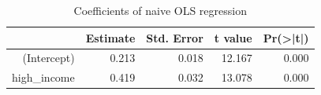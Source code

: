 \begin{table}[ht]
\centering
\begin{tabular}{rrrrr}
  \hline
 & Estimate & Std. Error & t value & Pr(>|t|) \\ 
  \hline
(Intercept) & 0.213 & 0.018 & 12.167 & 0.000 \\ 
  high\_income & 0.419 & 0.032 & 13.078 & 0.000 \\ 
   \hline
\end{tabular}
\caption{Coefficients of naive OLS regression} 
\label{tab:naive-regression}
\end{table}
